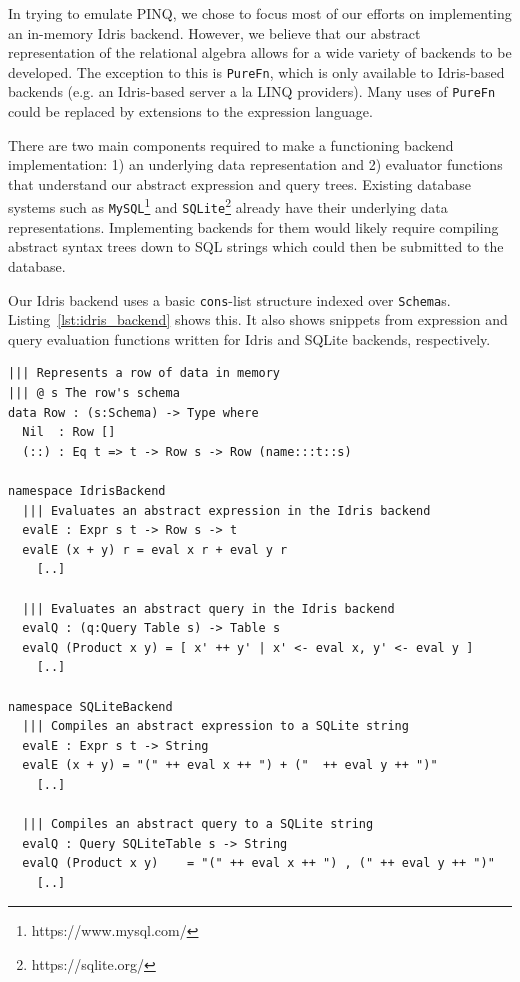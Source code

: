 \documentclass[12pt]{article}
\begin{document}
In trying to emulate PINQ, we chose to focus most of our efforts on implementing an in-memory Idris backend.
However, we believe that our abstract representation of the relational algebra allows for a wide variety of backends to be developed.
The exception to this is \texttt{PureFn}, which is only available to Idris-based backends (e.g. an Idris-based server a la LINQ providers).
Many uses of \texttt{PureFn} could be replaced by extensions to the expression language.

There are two main components required to make a functioning backend implementation:
1) an underlying data representation and
2) evaluator functions that understand our abstract expression and query trees.
Existing database systems such as \texttt{MySQL}\footnote{https://www.mysql.com/} and \texttt{SQLite}\footnote{https://sqlite.org/} already have their underlying data representations.
Implementing backends for them would likely require compiling abstract syntax trees down to SQL strings which could then be submitted to the database.

Our Idris backend uses a basic \texttt{cons}-list structure indexed over \texttt{Schema}s.
Listing~\ref{lst:idris_backend} shows this.
It also shows snippets from expression and query evaluation functions written for Idris and SQLite backends, respectively.

\begin{lstlisting}[caption={Implementing backends (snippets)},label={lst:idris_backend}]
||| Represents a row of data in memory
||| @ s The row's schema
data Row : (s:Schema) -> Type where
  Nil  : Row []
  (::) : Eq t => t -> Row s -> Row (name:::t::s)

namespace IdrisBackend
  ||| Evaluates an abstract expression in the Idris backend
  evalE : Expr s t -> Row s -> t
  evalE (x + y) r = eval x r + eval y r
    [..]

  ||| Evaluates an abstract query in the Idris backend
  evalQ : (q:Query Table s) -> Table s
  evalQ (Product x y) = [ x' ++ y' | x' <- eval x, y' <- eval y ]
    [..]

namespace SQLiteBackend
  ||| Compiles an abstract expression to a SQLite string
  evalE : Expr s t -> String
  evalE (x + y) = "(" ++ eval x ++ ") + ("  ++ eval y ++ ")"
    [..]

  ||| Compiles an abstract query to a SQLite string
  evalQ : Query SQLiteTable s -> String
  evalQ (Product x y)    = "(" ++ eval x ++ ") , (" ++ eval y ++ ")"
    [..]
\end{lstlisting}
\end{document}
